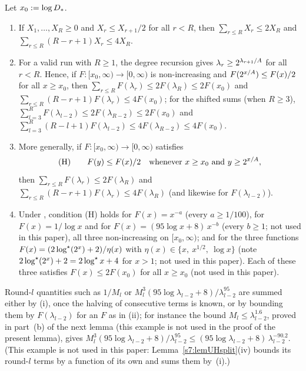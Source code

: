 \begin{lemma}\label{s2:lemLacunary}
Let $x_0\mathrel{:=}\log D_{*}$.
\begin{enumerate}
\item[(i)] If $X_1,\dots,X_R\ge0$ and $X_r\le X_{r+1}/2$ for all $r<R$, then
$\sum_{r\le R}X_r\le2X_R$ and $\sum_{r\le R}(R-r+1)X_r\le4X_R$.
\item[(ii)] For a valid run with $R\ge1$, the degree recursion gives
$\lambda_r\ge2^{\lambda_{r+1}/A}$ for all $r<R$. Hence, if
$F:[x_0,\infty)\to[0,\infty)$ is non-increasing and $F(2^{x/A})\le F(x)/2$
for all $x\ge x_0$, then $\sum_{r\le R}F(\lambda_r)\le2F(\lambda_R)\le
2F(x_0)$ and $\sum_{r\le R}(R-r+1)F(\lambda_r)\le4F(x_0)$; for the shifted
sums (when $R\ge3$), $\sum_{l=3}^RF(\lambda_{l-2})\le2F(\lambda_{R-2})\le2F(x_0)$
and $\sum_{l=3}^R(R-l+1)F(\lambda_{l-2})\le4F(\lambda_{R-2})\le4F(x_0)$.
\item[(iii)] More generally, if $F:[x_0,\infty)\to[0,\infty)$ satisfies
\[
\text{(H)}\qquad F(y)\le F(x)/2\quad\text{whenever } x\ge x_0\text{ and }
y\ge2^{x/A},
\]
then $\sum_{r\le R}F(\lambda_r)\le2F(\lambda_R)$ and $\sum_{r\le
R}(R-r+1)F(\lambda_r)\le4F(\lambda_R)$ (and likewise for $F(\lambda_{l-2})$).
\item[(iv)] Under , condition (H) holds for $F(x)=x^{-a}$ (every $a\ge
1/100$), for $F(x)=1/\log x$ and for $F(x)=(95\log x+8)\,x^{-b}$ (every $b\ge
1$; not used in this paper), all three non-increasing on $[x_0,\infty)$;
and for the three
functions $F(x)=(2\log^{\star}(2^x)+2)/\eta(x)$ with $\eta(x)\in\{x,\ x^{1/2},\
\log x\}$ (note $2\log^{\star}(2^x)+2=2\log^{\star} x+4$ for $x>1$; not used in this
paper). Each of these three
satisfies $F(x)\le2F(x_0)$ for all $x\ge x_0$ (not used in this paper).
\end{enumerate}
Round-$l$ quantities such as $1/M_l$ or
$M_l^3(95\log\lambda_{l-2}+8)/\lambda_{l-2}^{95}$ are summed either by (i),
once the halving of consecutive terms is known, or by bounding them by
$F(\lambda_{l-2})$ for an $F$ as in (ii); for instance the bound
$M_l\le\lambda_{l-2}^{1.6}$, proved in part~(b) of the next lemma (this
example is not used in the proof of the present lemma), gives
$M_l^3(95\log\lambda_{l-2}+8)/\lambda_{l-2}^{95}\le(95\log\lambda_{l-2}+8)\,
\lambda_{l-2}^{-90.2}$. (This example is not used in this paper:
Lemma~\ref{s7:lemUHsplit}(iv) bounds its round-$l$ terms by a function of its
own and sums them by~(i).)
\deps{\ref{s2:propDegRec}, \ref{s1:condG1}}
\end{lemma}

